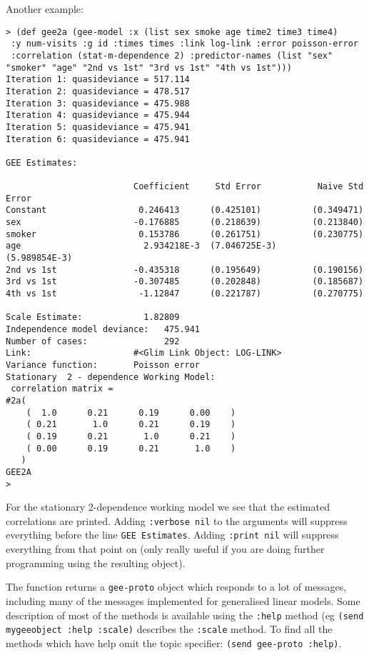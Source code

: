 \documentclass[10pt]{article}
\begin{document}
Another example:\\
\begin{verbatim}
> (def gee2a (gee-model :x (list sex smoke age time2 time3 time4)
 :y num-visits :g id :times times :link log-link :error poisson-error
 :correlation (stat-m-dependence 2) :predictor-names (list "sex" 
"smoker" "age" "2nd vs 1st" "3rd vs 1st" "4th vs 1st")))
Iteration 1: quasideviance = 517.114
Iteration 2: quasideviance = 478.517
Iteration 3: quasideviance = 475.988
Iteration 4: quasideviance = 475.944
Iteration 5: quasideviance = 475.941
Iteration 6: quasideviance = 475.941

GEE Estimates:

                         Coefficient     Std Error           Naive Std Error
Constant                  0.246413      (0.425101)          (0.349471)
sex                      -0.176885      (0.218639)          (0.213840)
smoker                    0.153786      (0.261751)          (0.230775)
age                        2.934218E-3  (7.046725E-3)       (5.989854E-3)
2nd vs 1st               -0.435318      (0.195649)          (0.190156)
3rd vs 1st               -0.307485      (0.202848)          (0.185687)
4th vs 1st                -1.12847      (0.221787)          (0.270775)

Scale Estimate:            1.82809    
Independence model deviance:   475.941    
Number of cases:               292
Link:                    #<Glim Link Object: LOG-LINK>
Variance function:       Poisson error
Stationary  2 - dependence Working Model: 
 correlation matrix =
#2a(
    (  1.0      0.21      0.19      0.00    )
    ( 0.21       1.0      0.21      0.19    )
    ( 0.19      0.21       1.0      0.21    )
    ( 0.00      0.19      0.21       1.0    )
   )
GEE2A
> 
\end{verbatim}

For the stationary 2-dependence working model we see that the estimated correlations are printed. Adding \texttt{:verbose nil} to the arguments will suppress everything before the line \texttt{GEE Estimates}. Adding \texttt{:print nil} will suppress everything from that point on (only really useful if you are doing further programming using the resulting object).


The function returns a \texttt{gee-proto} object which responds to a lot of messages, including many of the messages implemented for generalised linear models. Some description of most of the methods is available using the \texttt{:help} method (eg \texttt{(send mygeeobject :help :scale)} describes the \texttt{:scale} method. To find all the methods which have help omit the topic specifier: \texttt{(send gee-proto :help)}.
\end{document}
